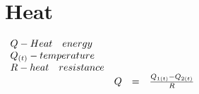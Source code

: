 \section*{Heat}
\begin{minipage}[l]{\linewidth}
	\Large
	$\begin{array}{ l l l l }
		Q - Heat \quad energy & & & \\
		Q_{(t)} - temperature & & & \\
		R - heat \quad resistance & & & \\
		& Q & = & \frac{Q_{1(t)} - Q_{2(t)}}{R}
	\end{array}$
\end{minipage}
\begin{comment}
\newline
\vspace{1cm}
\newline
$\frac{A \times B}{C}\times D \approx E$,
\newline
\begin{minipage}{0pt}
	$$\begin{array}{l | l}
		\text{Média aritmetica dados classificados} & \text{Variância de uma amostra dados classificados} \\
		\overline{x} = \frac{1}{n}\sum_{i=1}^cx_in_i = \sum_{i=1}^cx_if_i & s^2 = \frac{1}{n-1}\sum_{i=1}^c (x_i-\bar{x})^2 n_i
	\end{array}$$
\end{minipage}
\newline
\vspace{1cm}
\newline
$IC_{1-\alpha}=\left[ A, B\right]$ ; para $1-\alpha = 0.95$, $\alpha=0.05$, $\frac{\alpha}{2}=0.025$
\newline
\vspace{1cm}
\newline
Zona critica $Z_c=Z_{1-\frac{\alpha}{2}}=\Phi^{-1}(0.975) \cong 1.96$
\newline
\vspace{1cm}
\newline
$P\left( A \leqslant \mu \leqslant B \right) = 1-\alpha$ \\
$\triangle=Z_c\times\frac{\delta}{\sqrt{n}}$ \\
$A = \bar{x}-\triangle \qquad and \qquad B = \bar{x}+\triangle$ \\
$\therefore$\\
$IC_{A_{0.95}}=\left[ \; 18.8877 \: , \: 21.1956 \; \right]$ \hspace{1cm} and \hspace{1cm} $IC_{B_{0.95}}=\left[ \; 20.4519 \: , \: 22.6314 \; \right]$

\end{comment}
